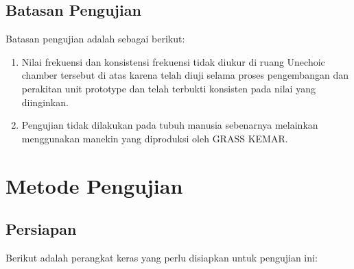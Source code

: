 \documentclass[12pt,]{article}
\begin{document}
	\subsection{Batasan Pengujian}

	Batasan pengujian adalah sebagai berikut:

	\begin{enumerate}
		\item Nilai frekuensi dan konsistensi frekuensi tidak diukur di ruang Unechoic chamber tersebut di atas
		karena telah diuji selama proses pengembangan dan perakitan unit prototype dan telah terbukti konsisten pada nilai yang diinginkan.

		\item Pengujian tidak dilakukan pada tubuh manusia sebenarnya melainkan menggunakan manekin yang diproduksi oleh GRASS KEMAR.
	\end{enumerate}


	\newpage
	\section{Metode Pengujian}

	\subsection{Persiapan}

	Berikut adalah perangkat keras yang perlu disiapkan untuk pengujian ini:
\end{document}
